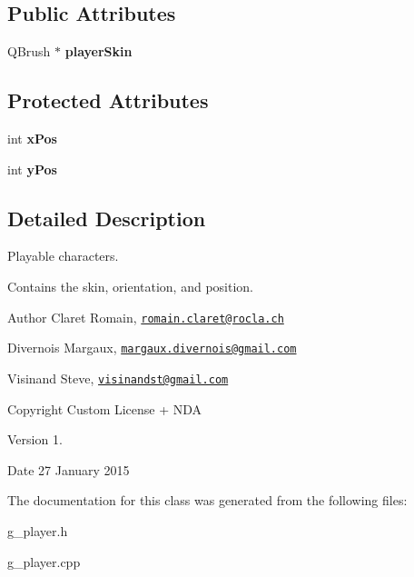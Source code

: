 \subsection*{Public Attributes}
\begin{DoxyCompactItemize}
\item 
\hypertarget{class_g___player_a88ad04efae22def4de689e08b79eef17}{}Q\+Brush $\ast$ {\bfseries player\+Skin}\label{class_g___player_a88ad04efae22def4de689e08b79eef17}

\end{DoxyCompactItemize}
\subsection*{Protected Attributes}
\begin{DoxyCompactItemize}
\item 
\hypertarget{class_g___player_abb97893871f5300202f11be75ec50ee8}{}int {\bfseries x\+Pos}\label{class_g___player_abb97893871f5300202f11be75ec50ee8}

\item 
\hypertarget{class_g___player_a5ffad65e53775d0888734d959ee2c0ca}{}int {\bfseries y\+Pos}\label{class_g___player_a5ffad65e53775d0888734d959ee2c0ca}

\end{DoxyCompactItemize}


\subsection{Detailed Description}
Playable characters. 

Contains the skin, orientation, and position. \begin{DoxyAuthor}{Author}
Claret Romain, \href{mailto:romain.claret@rocla.ch}{\tt romain.\+claret@rocla.\+ch} 

Divernois Margaux, \href{mailto:margaux.divernois@gmail.com}{\tt margaux.\+divernois@gmail.\+com} 

Visinand Steve, \href{mailto:visinandst@gmail.com}{\tt visinandst@gmail.\+com} 
\end{DoxyAuthor}
\begin{DoxyCopyright}{Copyright}
Custom License + N\+D\+A 
\end{DoxyCopyright}
\begin{DoxyVersion}{Version}
1. 
\end{DoxyVersion}
\begin{DoxyDate}{Date}
27 January 2015 
\end{DoxyDate}


The documentation for this class was generated from the following files\+:\begin{DoxyCompactItemize}
\item 
g\+\_\+player.\+h\item 
g\+\_\+player.\+cpp\end{DoxyCompactItemize}
